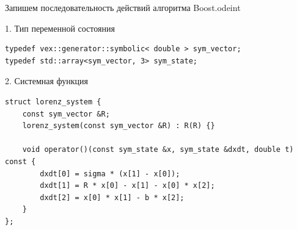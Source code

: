 \documentclass[@BEAMER_OPTIONS@]{beamer}
\begin{document}

\begin{frame}[fragile]{Запишем последовательность действий алгоритма Boost.odeint}
    \begin{exampleblock}{1. Тип переменной состояния}
        \begin{lstlisting}
typedef vex::generator::symbolic< double > sym_vector;
typedef std::array<sym_vector, 3> sym_state;
        \end{lstlisting}
    \end{exampleblock}

    \begin{exampleblock}{2. Системная функция}
        \begin{lstlisting}[firstnumber=last]
struct lorenz_system {
    const sym_vector &R;
    lorenz_system(const sym_vector &R) : R(R) {}

    void operator()(const sym_state &x, sym_state &dxdt, double t) const {
        dxdt[0] = sigma * (x[1] - x[0]);
        dxdt[1] = R * x[0] - x[1] - x[0] * x[2];
        dxdt[2] = x[0] * x[1] - b * x[2];
    }
};
        \end{lstlisting}
    \end{exampleblock}
\end{frame}

\end{document}
